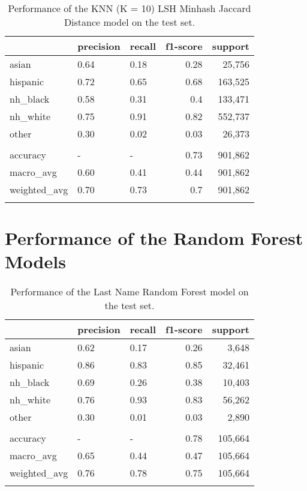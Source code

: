 \documentclass[12pt, letterpaper]{article}
\begin{document}
\begin{table}[h!]
\centering
\caption{Performance of the KNN (K = 10) LSH Minhash Jaccard Distance model on the test set.}
\begin{tabular}{lllrr}
\hline
              & precision   & recall   &   f1-score &   support \\
\hline
 asian        & 0.64        & 0.18     &       0.28 &     25,756 \\
 hispanic     & 0.72        & 0.65     &       0.68 &    163,525 \\
 nh\_black     & 0.58        & 0.31     &       0.4  &    133,471 \\
 nh\_white     & 0.75        & 0.91     &       0.82 &    552,737 \\
 other        & 0.30        & 0.02     &       0.03 &     26,373 \\
              &             &          &            &           \\
 accuracy     & -           & -        &       0.73 &    901,862 \\
 macro\_avg    & 0.60        & 0.41     &       0.44 &    901,862 \\
 weighted\_avg & 0.70        & 0.73     &       0.7  &    901,862 \\
\hline
\label{table:knn_full_name}
\end{tabular}
\end{table}

\clearpage
\section{Performance of the Random Forest Models}\label{rf_perf}

\begin{table}[h!]
\centering
\caption{Performance of the Last Name Random Forest model on the test set.}
\begin{tabular}{lllrr}
\hline
              & precision   & recall   &   f1-score &   support \\
\hline
 asian        & 0.62        & 0.17     &       0.26 &      3,648 \\
 hispanic     & 0.86        & 0.83     &       0.85 &     32,461 \\
 nh\_black     & 0.69        & 0.26     &       0.38 &     10,403 \\
 nh\_white     & 0.76        & 0.93     &       0.83 &     56,262 \\
 other        & 0.30        & 0.01     &       0.03 &      2,890 \\
              &             &          &            &           \\
 accuracy     & -           & -        &       0.78 &    105,664 \\
 macro\_avg    & 0.65        & 0.44     &       0.47 &    105,664 \\
 weighted\_avg & 0.76        & 0.78     &       0.75 &    105,664 \\
\hline
\label{table:rf_last_name}
\end{tabular}
\end{table}
\end{document}
